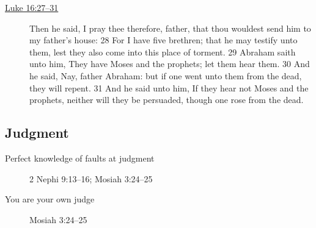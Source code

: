 			\begin{description}
			
				\item[{\hyperref[LUKE-16-27]{Luke 16:27--31}}] Then he said, I pray thee therefore, father, that thou wouldest send him to my father's house: 28 For I have five brethren; that he may testify unto them, lest they also come into this place of torment. 29 Abraham saith unto him, They have Moses and the prophets; let them hear them. 30 And he said, Nay, father Abraham: but if one went unto them from the dead, they will repent. 31 And he said unto him, If they hear not Moses and the prophets, neither will they be persuaded, though one rose from the dead.
			
			\end{description}
		
	\subsection{Judgment}
	
		\begin{description}
		
			\item[Perfect knowledge of faults at judgment] 2 Nephi 9:13--16; Mosiah 3:24--25 
			
			\item[You are your own judge] Mosiah 3:24--25
		
		\end{description}